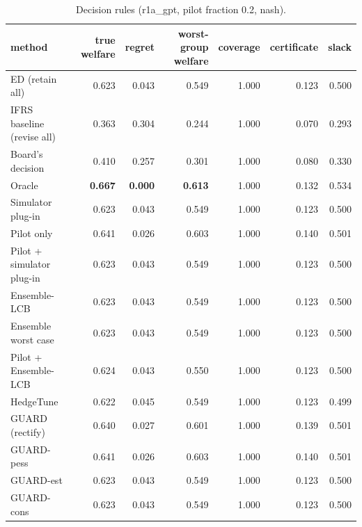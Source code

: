 \begin{table}[t]
\centering
\small
\begin{tabular}{lrrrrrr}
\toprule
method & true welfare & regret & worst-group welfare & coverage & certificate & slack \\
\midrule
ED (retain all) & 0.623 & 0.043 & 0.549 & 1.000 & 0.123 & 0.500 \\
IFRS baseline (revise all) & 0.363 & 0.304 & 0.244 & 1.000 & 0.070 & 0.293 \\
Board's decision & 0.410 & 0.257 & 0.301 & 1.000 & 0.080 & 0.330 \\
Oracle & \textbf{0.667} & \textbf{0.000} & \textbf{0.613} & 1.000 & 0.132 & 0.534 \\
Simulator plug-in & 0.623 & 0.043 & 0.549 & 1.000 & 0.123 & 0.500 \\
Pilot only & 0.641 & 0.026 & 0.603 & 1.000 & 0.140 & 0.501 \\
Pilot + simulator plug-in & 0.623 & 0.043 & 0.549 & 1.000 & 0.123 & 0.500 \\
Ensemble-LCB & 0.623 & 0.043 & 0.549 & 1.000 & 0.123 & 0.500 \\
Ensemble worst case & 0.623 & 0.043 & 0.549 & 1.000 & 0.123 & 0.500 \\
Pilot + Ensemble-LCB & 0.624 & 0.043 & 0.550 & 1.000 & 0.123 & 0.500 \\
HedgeTune & 0.622 & 0.045 & 0.549 & 1.000 & 0.123 & 0.499 \\
GUARD (rectify) & 0.640 & 0.027 & 0.601 & 1.000 & 0.139 & 0.501 \\
GUARD-pess & 0.641 & 0.026 & 0.603 & 1.000 & 0.140 & 0.501 \\
GUARD-est & 0.623 & 0.043 & 0.549 & 1.000 & 0.123 & 0.500 \\
GUARD-cons & 0.623 & 0.043 & 0.549 & 1.000 & 0.123 & 0.500 \\
\bottomrule
\end{tabular}
\caption{Decision rules (r1a\_gpt, pilot fraction 0.2, nash).}
\label{tab:methods-nash}
\end{table}
